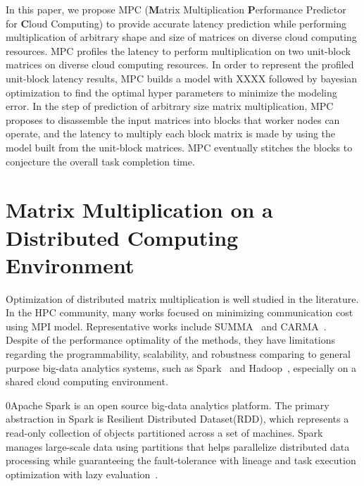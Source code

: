 \documentclass[10pt, conference, compsocconf]{IEEEtran}
\begin{document}
In this paper, we propose MPC (\textbf{M}atrix Multiplication \textbf{P}erformance Predictor for \textbf{C}loud Computing) to provide accurate latency prediction while performing multiplication of arbitrary shape and size of matrices on diverse cloud computing resources. MPC profiles the latency to perform multiplication on two unit-block matrices on diverse cloud computing resources. In order to represent the profiled unit-block latency results, MPC builds a model with XXXX followed by bayesian optimization to find the optimal hyper parameters to minimize the modeling error. In the step of prediction of arbitrary size matrix multiplication, MPC proposes to disassemble the input matrices into blocks that worker nodes can operate, and the latency to multiply each block matrix is made by using the model built from the unit-block matrices. MPC eventually stitches the blocks to conjecture the overall task completion time.


\section{Matrix Multiplication on a Distributed Computing Environment}\label{sec:distributed-matrix-computation}
Optimization of distributed matrix multiplication is well studied in the literature. In the HPC community, many works focused on minimizing communication cost using MPI model. Representative works include SUMMA~\cite{summa} and CARMA~\cite{carma}. Despite of the performance optimality of the methods, they have limitations regarding the programmability, scalability, and robustness comparing to general purpose big-data analytics systems, such as Spark~\cite{spark} and Hadoop~\cite{hadoop}, especially on a shared cloud computing environment.

0Apache Spark is an open source big-data analytics platform. The primary abstraction in Spark is Resilient Distributed Dataset(RDD), which represents a read-only collection of objects partitioned across a set of machines. Spark manages large-scale data using partitions that helps parallelize distributed data processing while guaranteeing the fault-tolerance with lineage and task execution optimization with lazy evaluation~\cite{spark}.
\end{document}
